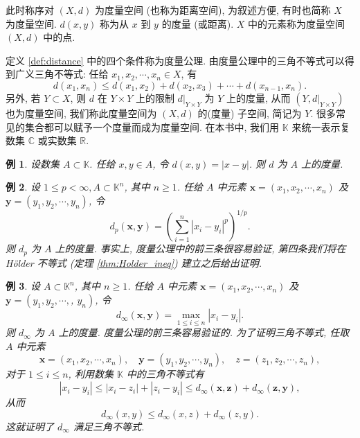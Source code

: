 \documentclass[openany]{ctexbook}
\theoremstyle{kaiti}
\theoremstyle{normal}
\newtheorem{example}{例}[section]
\begin{document}
此时称序对 $(X, d)$ 为度量空间 (也称为距离空间), 为叙述方便, 有时也简称 $X$ 为度量空间. $d(x, y)$ 称为从 $x$ 到 $y$ 的度量 (或距离). $X$ 中的元素称为度量空间 $(X, d)$ 中的点.

定义 \ref{def:distance} 中的四个条件称为度量公理. 由度量公理中的三角不等式可以得到广义三角不等式: 任给 $x_1, x_2, \cdots, x_n \in X$, 有
$$
d\left(x_1, x_n\right) \leqslant d\left(x_1, x_2\right)+d\left(x_2, x_3\right)+\cdots+d\left(x_{n-1}, x_n\right).
$$
另外, 若 $Y \subset X$, 则 $d$ 在 $Y \times Y$ 上的限制 $d|_{Y \times Y}$ 为 $Y$ 上的度量, 从而 $\left(Y,d|_{Y \times Y}\right)$ 也为度量空间, 我们称此度量空间为 $(X, d)$ 的(度量) 子空间, 简记为 $Y$.
很多常见的集合都可以赋予一个度量而成为度量空间. 在本书中, 我们用 $\mathbb{K}$ 来统一表示复数集 $\mathbb{C}$ 或实数集 $\mathbb{R}$.

\begin{example}
  设数集 $A\subset\mathbb{K}$. 任给 $x,y\in A$, 令 $d(x,y)=|x-y|$. 则 $d$ 为 $A$ 上的度量.
\end{example}

\begin{example}
  设 $1 \leqslant p<\infty, A \subset \mathbb{K}^n$, 其中 $n \geqslant 1$. 任给 $A$ 中元素 $\boldsymbol{x}=\left(x_1, x_2, \cdots, x_n\right)$ 及 $\boldsymbol{y}=\left(y_1, y_2, \cdots, y_n\right)$, 令
  $$
  d_{p}(\boldsymbol{x}, \boldsymbol{y})=\left(\sum_{i=1}^n\left|x_{i}-y_{i}\right|^{p}\right)^{1 / p}.
  $$
  则 $d_{p}$ 为 $A$ 上的度量. 事实上, 度量公理中的前三条很容易验证, 第四条我们将在 Hölder 不等式 (定理 \ref{thm:Holder_ineq}) 建立之后给出证明.
\end{example}

\begin{example}
  设 $A \subset \mathbb{K}^n$, 其中 $n \geqslant 1$. 任给 $A$ 中元素 $\boldsymbol{x}=\left(x_1, x_2, \cdots, x_n\right)$ 及 $\boldsymbol{y}=\left(y_1, y_2, \cdots,\right.$, $\left.y_n\right)$, 令
  $$
  d_{\infty}(\boldsymbol{x}, \boldsymbol{y})=\max_{1 \leqslant i \leqslant n}\left|x_{i}-y_{i}\right|.
  $$
  则 $d_{\infty}$ 为 $A$ 上的度量. 度量公理的前三条容易验证的. 为了证明三角不等式, 任取 $A$ 中元素
  $$
  \boldsymbol{x}=\left(x_1, x_2, \cdots, x_n\right), \quad \boldsymbol{y}=\left(y_1, y_2, \cdots, y_n\right), \quad z=\left(z_1, z_2, \cdots, z_n\right),
  $$
  对于 $1 \leqslant i \leqslant n$, 利用数集 $\mathbb{K}$ 中的三角不等式有
  $$
  \left|x_{i}-y_{i}\right| \leqslant\left|x_{i}-z_{i}\right|+\left|z_{i}-y_{i}\right| \leqslant d_{\infty}(\boldsymbol{x}, \boldsymbol{z})+d_{\infty}(\boldsymbol{z}, \boldsymbol{y}),
  $$
  从而
  $$
  d_{\infty}(x, y) \leqslant d_{\infty}(x, z)+d_{\infty}(z, y).
  $$
  这就证明了 $d_{\infty}$ 满足三角不等式.
\end{example}
\end{document}
